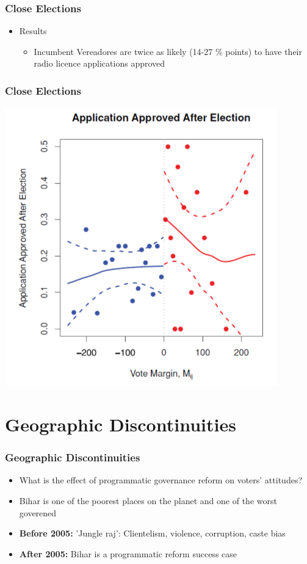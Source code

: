 \documentclass[xcolor=x11names,compress]{beamer}\usepackage[]{graphicx}\usepackage[]{color}
\renewcommand{\(}{\begin{columns}}
\renewcommand{\)}{\end{columns}}
\newcommand{\<}[1]{\begin{column}{#1}}
\renewcommand{\>}{\end{column}}
\begin{document}
\begin{frame}
\frametitle{Close Elections}
\begin{itemize}
\item Results
\begin{itemize}
\item Incumbent Vereadores are twice as likely (14-27 \% points) to have their radio licence applications approved
\end{itemize}
\end{itemize}
\end{frame}

\begin{frame}
\frametitle{Close Elections}
\begin{center}
\includegraphics[scale=0.33]{figure/BH_Results.png}
\end{center}
\end{frame}

\section{Geographic Discontinuities}

\begin{frame}
\frametitle{Geographic Discontinuities}
\begin{itemize}
\item What is the effect of programmatic governance reform on voters' attitudes?
\pause
\item Bihar is one of the poorest places on the planet and one of the worst goverened
\pause
\item \textbf{Before 2005:} 'Jungle raj': Clientelism, violence, corruption, caste bias
\pause
\item \textbf{After 2005:} Bihar is a programmatic reform success case
\pause
\end{itemize}
\end{frame}
\end{document}
